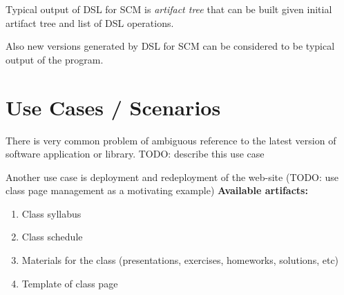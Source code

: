 \documentclass[11pt]{article}
\begin{document}

Typical output of DSL for SCM is \textit{artifact tree} that can be built given initial artifact tree and list of DSL operations. 


Also new versions generated by DSL for SCM can be considered to be typical output of the program.



\section{Use Cases / Scenarios}
\label{sec:examples}


There is very common problem of ambiguous reference to the latest version of software application or library. TODO: describe this use case

Another use case is deployment and redeployment of the web-site (TODO: use class page management as a motivating example)
\textbf{Available artifacts:}
\begin{enumerate}
\item Class syllabus
\item Class schedule 
\item Materials for the class (presentations, exercises, homeworks, solutions, etc)
\item Template of class page
\end{enumerate}
\end{document}
